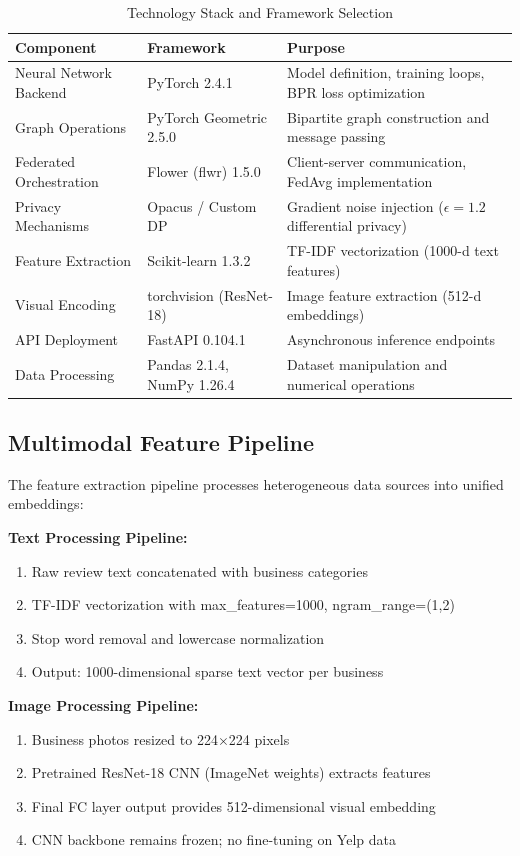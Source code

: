 \documentclass[12pt,a4paper]{report}
\begin{document}
{\begin{table}[htbp]
\centering
\small
\caption{Technology Stack and Framework Selection}
\label{tab:tech_stack}
\begin{tabular}{|l|l|p{6cm}|}
\hline
\textbf{Component} & \textbf{Framework} & \textbf{Purpose} \\ \hline
Neural Network Backend & PyTorch 2.4.1 & Model definition, training loops, BPR loss optimization \\ \hline
Graph Operations & PyTorch Geometric 2.5.0 & Bipartite graph construction and message passing \\ \hline
Federated Orchestration & Flower (flwr) 1.5.0 & Client-server communication, FedAvg implementation \\ \hline
Privacy Mechanisms & Opacus / Custom DP & Gradient noise injection ($\epsilon=1.2$ differential privacy) \\ \hline
Feature Extraction & Scikit-learn 1.3.2 & TF-IDF vectorization (1000-d text features) \\ \hline
Visual Encoding & torchvision (ResNet-18) & Image feature extraction (512-d embeddings) \\ \hline
API Deployment & FastAPI 0.104.1 & Asynchronous inference endpoints \\ \hline
Data Processing & Pandas 2.1.4, NumPy 1.26.4 & Dataset manipulation and numerical operations \\ \hline
\end{tabular}
\end{table}

\subsection{Multimodal Feature Pipeline}
The feature extraction pipeline processes heterogeneous data sources into unified embeddings:

\textbf{Text Processing Pipeline:}
\begin{enumerate}
    \item Raw review text concatenated with business categories
    \item TF-IDF vectorization with max\_features=1000, ngram\_range=(1,2)
    \item Stop word removal and lowercase normalization
    \item Output: 1000-dimensional sparse text vector per business
\end{enumerate}

\textbf{Image Processing Pipeline:}
\begin{enumerate}
    \item Business photos resized to 224$\times$224 pixels
    \item Pretrained ResNet-18 CNN (ImageNet weights) extracts features
    \item Final FC layer output provides 512-dimensional visual embedding
    \item CNN backbone remains frozen; no fine-tuning on Yelp data
\end{enumerate}

}
\end{document}
